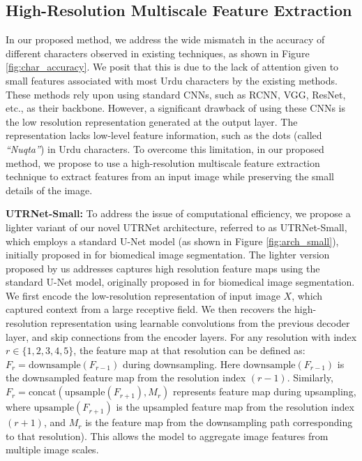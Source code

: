 \documentclass[runningheads]{llncs}
\newcommand{\ModelName}{{UTRNet}\xspace}
\newcommand{\mypara}[1]{\vspace{0.5em} \noindent \textbf{#1:}}
\begin{document}
\subsection{High-Resolution Multiscale Feature Extraction}
\label{architecture-high-resolution-cnn}

In our proposed method, we address the wide mismatch in the accuracy of different characters observed in existing techniques, as shown in Figure \ref{fig:char_accuracy}. We posit that this is due to the lack of attention given to small features associated with most Urdu characters by the existing methods. These methods rely upon using standard CNNs, such as RCNN\cite{rcnn_orig}, VGG\cite{vgg_orig}, ResNet\cite{resnet_orig}, etc., as their backbone. However, a significant drawback of using these CNNs is the low resolution representation generated at the output layer. The representation lacks low-level feature information, such as the dots (called \textit{``Nuqta''}) in Urdu characters. To overcome this limitation, in our proposed method, we propose to use a high-resolution multiscale feature extraction technique to extract features from an input image while preserving the small details of the image.

\mypara{\ModelName-Small}
To address the issue of computational efficiency, we propose a lighter variant of our novel \ModelName architecture, referred to as \ModelName-Small, which employs a standard U-Net model (as shown in Figure \ref{fig:arch_small}), initially proposed in \cite{unet_orig_paper} for biomedical image segmentation. The lighter version proposed by us addresses captures high resolution feature maps using the standard U-Net model, originally proposed in \cite{unet_orig_paper} for biomedical image segmentation. We first encode the low-resolution representation of input image \(X\), which captured context from a large receptive field. We then recovers the high-resolution representation using learnable convolutions from the previous decoder layer, and skip connections from the encoder layers. For any resolution with index $r \in \{1,2,3,4,5\}$, the feature map at that resolution can be defined as: $F_r = \text{downsample}(F_{r-1})$ during downsampling. Here $\text{downsample}(F_{r-1})$ is the downsampled feature map from the resolution index $(r-1)$. Similarly, $F_r = \text{concat}(\text{upsample}(F_{r+1}), M_{r})$ represents feature map during upsampling, where $\text{upsample}(F_{r+1})$ is the upsampled feature map from the resolution index $(r+1)$, and $M_{r}$ is the feature map from the downsampling path corresponding to that resolution). This allows the model to aggregate image features from multiple image scales.
\end{document}
